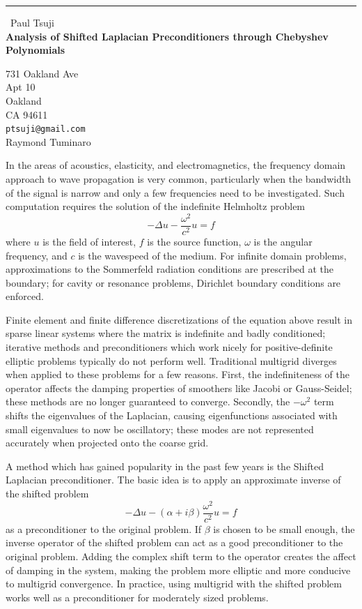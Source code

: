 \documentclass{report}
\begin{document}
\begin{center}
\rule{6in}{1pt} \
{\large Paul Tsuji \\
{\bf Analysis of Shifted Laplacian Preconditioners through Chebyshev Polynomials}}

731 Oakland Ave \\ Apt 10 \\ Oakland \\ CA 94611
\\
{\tt ptsuji@gmail.com}\\
Raymond Tuminaro\end{center}


In the areas of acoustics, elasticity, and electromagnetics, the
frequency domain approach to wave propagation is very common,
particularly when the bandwidth of the signal is narrow and only a few
frequencies need to be investigated. Such computation requires the
solution of the indefinite Helmholtz problem
\begin{equation}
-\Delta u - \frac{\omega^2}{c^2} u = f
\end{equation}
where $u$ is the field of interest, $f$ is the source function, $\omega$
is the angular frequency, and $c$ is the wavespeed of the medium. For
infinite domain problems, approximations to the Sommerfeld radiation
conditions are prescribed at the boundary; for cavity or resonance
problems, Dirichlet boundary conditions are enforced.

Finite element and finite difference discretizations of the equation
above result in sparse linear systems where the matrix is indefinite and
badly conditioned; iterative methods and preconditioners which work
nicely for positive-definite elliptic problems typically do not perform
well. Traditional multigrid diverges when applied to these problems for a
few reasons. First, the indefiniteness of the operator affects the
damping
properties of smoothers like Jacobi or Gauss-Seidel; these methods are no
longer guaranteed to converge. Secondly, the $-\omega^2$ term shifts the
eigenvalues of the Laplacian, causing eigenfunctions associated with
small eigenvalues to now be oscillatory; these modes are not represented
accurately when projected onto the coarse grid.

A method which has gained popularity in the past few years is the Shifted
Laplacian preconditioner. The basic idea is to apply an approximate
inverse of the shifted problem
\begin{equation}
-\Delta u - (\alpha + i \beta)\frac{\omega^2}{c^2} u = f
\label{eq:shifted}
\end{equation}
as a preconditioner to the original problem. If $\beta$ is chosen to be
small enough, the inverse operator of the shifted problem can act as a
good preconditioner to the original problem. Adding the complex shift
term to the operator creates the affect of damping in the system, making
the problem more elliptic and more conducive to multigrid convergence. In
practice, using multigrid with the shifted problem works well as a
preconditioner for moderately sized problems.
\end{document}
